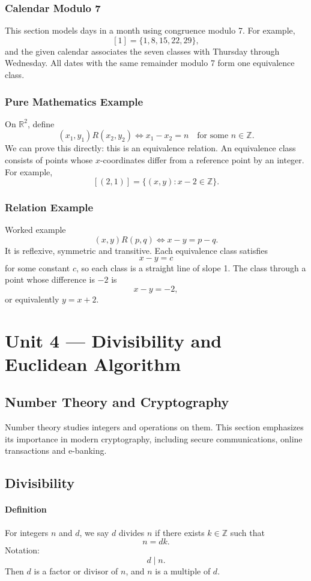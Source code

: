 \documentclass[12pt]{article}
\newcommand{\Definition}{\paragraph{Definition}}
\begin{document}
\subsubsection{Calendar Modulo 7}
This section models days in a month using congruence modulo 7. For example,
\[
[1]=\{1,8,15,22,29\},
\]
and the given calendar associates the seven classes with Thursday through Wednesday. All dates with the same remainder modulo 7 form one equivalence class.

\subsubsection{Pure Mathematics Example}
On $\mathbb R^2$, define
\[
(x_1,y_1)R(x_2,y_2)\iff x_1-x_2=n\quad\text{for some }n\in\mathbb Z.
\]
We can prove this directly: this is an equivalence relation. An equivalence class consists of points whose $x$-coordinates differ from a reference point by an integer. For example,
\[
[(2,1)]=\{(x,y):x-2\in\mathbb Z\}.
\]

\subsubsection{Relation Example}
Worked example
\[
(x,y)R(p,q)\iff x-y=p-q.
\]
It is reflexive, symmetric and transitive. Each equivalence class satisfies
\[
x-y=c
\]
for some constant $c$, so each class is a straight line of slope 1. The class through a point whose difference is $-2$ is
\[
x-y=-2,
\]
or equivalently $y=x+2$.

\newpage
\section{Unit 4 --- Divisibility and Euclidean Algorithm}

\subsection{Number Theory and Cryptography}
Number theory studies integers and operations on them. This section emphasizes its importance in modern cryptography, including secure communications, online transactions and e-banking.

\subsection{Divisibility}
\Definition For integers $n$ and $d$, we say $d$ divides $n$ if there exists $k\in\mathbb Z$ such that
\[
n=dk.
\]
Notation:
\[
d\mid n.
\]
Then $d$ is a factor or divisor of $n$, and $n$ is a multiple of $d$.
\end{document}

